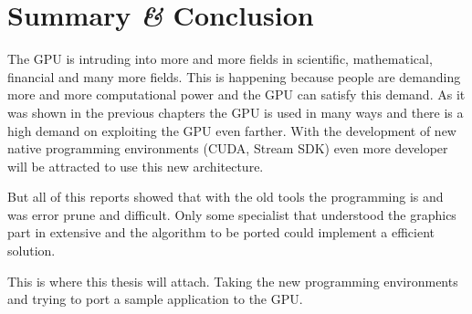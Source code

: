 \section{Summary {\textit{\&}} Conclusion} %
\label{sec:summary_conclusion}
The \gls{GPU} is intruding into more and more fields in scientific, mathematical, 
financial and many more fields. This is happening because people are demanding
more and more computational power and the \gls{GPU} can satisfy  this demand. 
As it was shown in the previous chapters the \gls{GPU} is used in many ways and
there is a high demand on exploiting the \gls{GPU} even farther. With the development
of new native programming environments (\gls{CUDA}, Stream \gls{SDK}) even more
developer will be attracted to use this new architecture. 

But all of this reports showed that with the old tools the programming is and was
error prune and difficult. Only some specialist that understood the graphics part
in extensive and the algorithm to be ported could implement a efficient solution. 

This is where this thesis will attach. Taking the new programming environments
and trying to port a sample application to the \gls{GPU}. 










